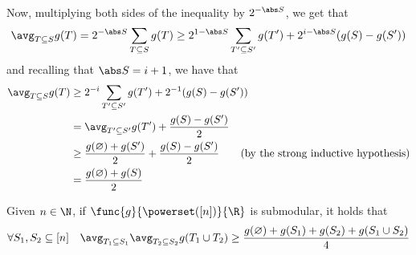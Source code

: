 \documentclass[a4paper, 12pt]{report}
\begin{document}
{\begin{equation*}
\begin{split}
            \end{split}
        \end{equation*}
        Now, multiplying both sides of the inequality by $2^{- \abs S}$, we get that $$\avg_{T \subseteq S}{g(T)} = 2^{- \abs S}\sum_{T \subseteq S}{g(T)} \ge 2 ^{1 - \abs S}\sum_{T' \subseteq S'}{g(T')} + 2^{i - \abs S}(g(S) - g(S'))$$ and recalling that $\abs S = i + 1$, we have that
        \begin{equation*}
            \begin{split}
                \avg_{T \subseteq S}{g(T)} &\ge 2^{- i}\sum_{T' \subseteq S'}{g(T')} + 2^{-1}(g(S) - g(S')) \\
                                           &= \avg_{T' \subseteq S'}{g(T')} + \dfrac{g(S) - g(S')}{2} \\
                                           &\ge \dfrac{g(\varnothing) + g(S')}{2} + \dfrac{g(S) - g(S')}{2} \quad \quad (\mathrm{by \ the \ strong \ inductive \ hypothesis}) \\
                                           &= \dfrac{g(\varnothing) + g(S)}{2}
            \end{split}
        \end{equation*}
    }

    \begin{framedlem}{}
        Given $n \in \N$, if $\func{g}{\powerset([n])}{\R}$ is submodular, it holds that $$\forall S_1, S_2 \subseteq [n] \quad \avg_{T_1 \subseteq S_1}{\avg_{T_2 \subseteq S_2}{g(T_1 \cup T_2)}} \ge \dfrac{g(\varnothing) + g(S_1) + g(S_2) + g(S_1 \cup S_2)}{4}$$
    \end{framedlem}
\end{document}

